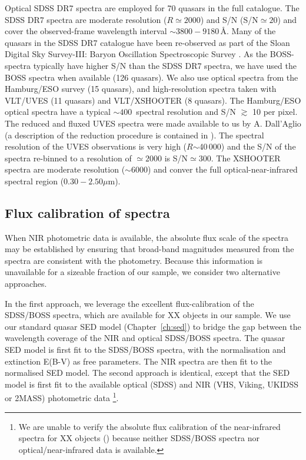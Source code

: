 Optical SDSS DR7 spectra are employed for 70 quasars in the full catalogue.  
The SDSS DR7 spectra are moderate resolution ($R$$\simeq2000$) and S/N (S/N$\simeq20$) and cover the observed-frame wavelength interval $\sim3800-9180$\,\AA.
Many of the quasars in the SDSS DR7 catalogue have been re-observed as part of the Sloan Digital Sky Survey-III: Baryon Oscillation Spectroscopic Survey \citep[SDSS-III/BOSS;][]{dawson13}. 
As the BOSS-spectra typically have higher S/N than the SDSS DR7 spectra, we have used the BOSS spectra when available (126 quasars).  
We also use optical spectra from the Hamburg/ESO survey (15 quasars), and high-resolution spectra taken with VLT/UVES (11 quasars) and VLT/XSHOOTER (8 quasars). 
The Hamburg/ESO optical spectra have a typical $\sim400$\kms\, spectral resolution and S/N $\gtrsim$ 10 per pixel. 
The reduced and fluxed UVES spectra were made available to us by A. Dall'Aglio (a description of the reduction procedure is contained in \citet{dallaglio08}).
The spectral resolution of the UVES observations is very high ($R$$\sim$40\,000) and the S/N of the spectra re-binned to a resolution of $\simeq2000$ is S/N$\simeq300$.  
The XSHOOTER spectra are moderate resolution ($\sim6000$) and conver the full optical-near-infrared spectral region ($0.30-2.50\mu$m). 

\subsection{Flux calibration of spectra}

When \ac{NIR} photometric data is available, the absolute flux scale of the spectra may be established by ensuring that broad-band magnitudes measured from the spectra are consistent with the photometry. 
Because this information is unavailable for a sizeable fraction of our sample, we consider two alternative approaches. 

In the first approach, we leverage the excellent flux-calibration of the \ac{SDSS}/\ac{BOSS} spectra, which are available for XX objects in our sample. 
We use our standard quasar \ac{SED} model (Chapter~\ref{ch:sed}) to bridge the gap between the wavelength coverage of the \ac{NIR} and optical \ac{SDSS}/\ac{BOSS} spectra.
The quasar \ac{SED} model is first fit to the \ac{SDSS}/\ac{BOSS} spectra, with the normalisation and extinction E(B-V) as free parameters. 
The \ac{NIR} spectra are then fit to the normalised \ac{SED} model. 
The second approach is identical, except that the \ac{SED} model is first fit to the available optical (\ac{SDSS}) and \ac{NIR} (VHS, Viking, UKIDSS or 2MASS) photometric data \footnote{We are unable to verify the absolute flux calibration of the near-infrared spectra for XX objects () because neither SDSS/BOSS spectra nor optical/near-infrared data is available.}. 

